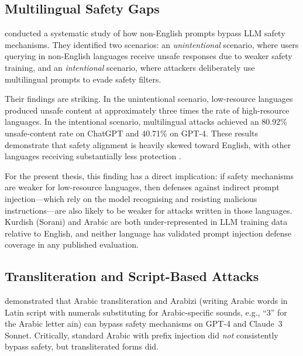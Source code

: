 \subsection{Multilingual Safety Gaps}

\begin{justify}
\cite{deng2024multilingual} conducted a systematic study of how non-English prompts bypass LLM safety mechanisms.  They identified two scenarios: an \emph{unintentional} scenario, where users querying in non-English languages receive unsafe responses due to weaker safety training, and an \emph{intentional} scenario, where attackers deliberately use multilingual prompts to evade safety filters.
\end{justify}

\begin{justify}
Their findings are striking.  In the unintentional scenario, low-resource languages produced unsafe content at approximately three times the rate of high-resource languages.  In the intentional scenario, multilingual attacks achieved an 80.92\% unsafe-content rate on ChatGPT and 40.71\% on GPT-4.  These results demonstrate that safety alignment is heavily skewed toward English, with other languages receiving substantially less protection \citep{deng2024multilingual}.
\end{justify}

\begin{justify}
For the present thesis, this finding has a direct implication: if safety mechanisms are weaker for low-resource languages, then defenses against indirect prompt injection---which rely on the model recognising and resisting malicious instructions---are also likely to be weaker for attacks written in those languages.  Kurdish (Sorani) and Arabic are both under-represented in LLM training data relative to English, and neither language has validated prompt injection defense coverage in any published evaluation.
\end{justify}

\subsection{Transliteration and Script-Based Attacks}

\begin{justify}
\cite{alghanim2024jailbreaking} demonstrated that Arabic transliteration and Arabizi (writing Arabic words in Latin script with numerals substituting for Arabic-specific sounds, e.g., ``3'' for the Arabic letter ain) can bypass safety mechanisms on GPT-4 and Claude~3 Sonnet.  Critically, standard Arabic with prefix injection did \emph{not} consistently bypass safety, but transliterated forms did.
\end{justify}

